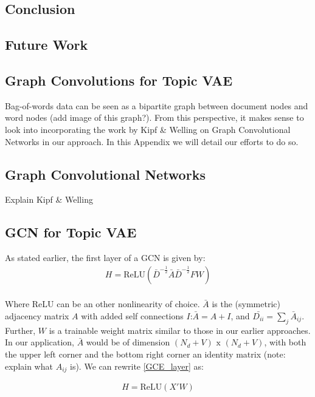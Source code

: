\documentclass{report}
\begin{document}
\section{Conclusion}
\section{Future Work}


\begin{appendices}
	\chapter{Graph Convolutions for Topic VAE}
	
	Bag-of-words data can be seen as a bipartite graph between document nodes and word nodes (add image of this graph?). From this perspective, it makes sense to look into incorporating the work by Kipf \& Welling on Graph Convolutional Networks in our approach. In this Appendix we will detail our efforts to do so. \\
	\section{Graph Convolutional Networks}
	Explain Kipf \& Welling 
	\section{GCN for Topic VAE}	
	As stated earlier, the first layer of a GCN is given by:
	\begin{align}\label{GCE_layer}
	H = \text{ReLU}(\bar{D}^{-\frac{1}{2}}\bar{A}\bar{D}^{-\frac{1}{2}}FW)
	\end{align}
	\\
	Where ReLU can be an other nonlinearity of choice. $\bar{A}$ is the (symmetric) adjacency matrix $A$ with added self connections $I$:$\bar{A} = A+I$, and $\bar{D_{ii}}=\sum_j\bar{A}_{ij}$. Further, $W$ is a trainable weight matrix similar to those in our earlier approaches. In our application, $\bar{A}$ would be of dimension $(N_d + V) \text{ x } (N_d + V)$, with both the upper left corner and the bottom right corner an identity matrix (note: explain what $A_{ij}$ is). We can rewrite \ref{GCE_layer} as:
	
	\begin{align}
	H = \text{ReLU}(X'W)
	\end{align}
	

\end{appendices}
\end{document}
